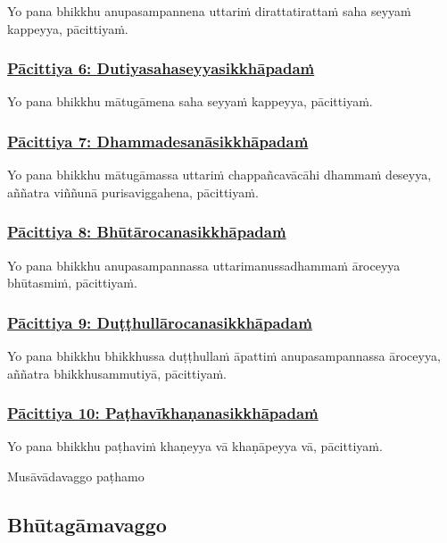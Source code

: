 Yo pana bhikkhu anupasampannena uttariṁ dirattatirattaṁ saha seyyaṁ kappeyya, pācittiyaṁ.

\subsubsection*{\hyperref[exp6]{Pācittiya 6: Dutiyasahaseyyasikkhāpadaṁ}}
\label{pac6}

Yo pana bhikkhu mātugāmena saha seyyaṁ kappeyya, pācittiyaṁ.

\subsubsection*{\hyperref[exp7]{Pācittiya 7: Dhammadesanāsikkhāpadaṁ}}
\label{pac7}

Yo pana bhikkhu mātugāmassa uttariṁ chappañcavācāhi dhammaṁ deseyya, aññatra viññunā purisaviggahena, pācittiyaṁ.

\subsubsection*{\hyperref[exp8]{Pācittiya 8: Bhūtārocanasikkhāpadaṁ}}
\label{pac8}

Yo pana bhikkhu anupasampannassa uttarimanussadhammaṁ āroceyya bhūtasmiṁ, pācittiyaṁ.

\subsubsection*{\hyperref[exp9]{Pācittiya 9: Duṭṭhullārocanasikkhāpadaṁ}}
\label{pac9}

Yo pana bhikkhu bhikkhussa duṭṭhullaṁ āpattiṁ anupasampannassa āroceyya, aññatra bhikkhusammutiyā, pācittiyaṁ.

\subsubsection*{\hyperref[exp10]{Pācittiya 10: Paṭhavīkhaṇanasikkhāpadaṁ}}
\label{pac10}

Yo pana bhikkhu paṭhaviṁ khaṇeyya vā khaṇāpeyya vā, pācittiyaṁ.

\begin{center}
  Musāvādavaggo paṭhamo
\end{center}

\subsection{Bhūtagāmavaggo}
\vspace{0.2cm}

